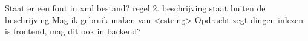 Staat er een fout in xml bestand? regel 2. beschrijving staat buiten de beschrijving
Mag ik gebruik maken van <cstring>
Opdracht zegt dingen inlezen is frontend, mag dit ook in backend?